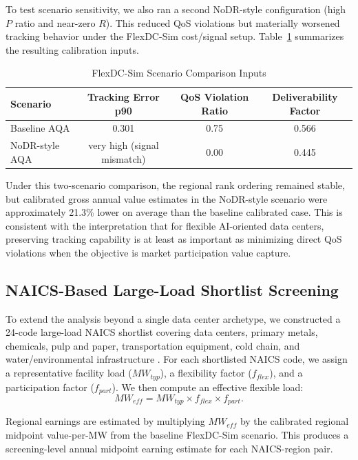 \documentclass[12pt]{article}
\begin{document}
To test scenario sensitivity, we also ran a second NoDR-style configuration (high $P$ ratio and near-zero $R$). This reduced QoS violations but materially worsened tracking behavior under the FlexDC-Sim cost/signal setup. Table~\ref{tab:flexdc_scenarios} summarizes the resulting calibration inputs.

\begin{table}[h]
\centering
\caption{FlexDC-Sim Scenario Comparison Inputs}\label{tab:flexdc_scenarios}
\begin{tabular}{lccc}
\toprule
\textbf{Scenario} & \textbf{Tracking Error p90} & \textbf{QoS Violation Ratio} & \textbf{Deliverability Factor} \\
\midrule
Baseline AQA & 0.301 & 0.75 & 0.566 \\
NoDR-style AQA & very high (signal mismatch) & 0.00 & 0.445 \\
\bottomrule
\end{tabular}
\end{table}

Under this two-scenario comparison, the regional rank ordering remained stable, but calibrated gross annual value estimates in the NoDR-style scenario were approximately 21.3\% lower on average than the baseline calibrated case. This is consistent with the interpretation that for flexible AI-oriented data centers, preserving tracking capability is at least as important as minimizing direct QoS violations when the objective is market participation value capture.

\subsection{NAICS-Based Large-Load Shortlist Screening}

To extend the analysis beyond a single data center archetype, we constructed a 24-code large-load NAICS shortlist covering data centers, primary metals, chemicals, pulp and paper, transportation equipment, cold chain, and water/environmental infrastructure \citep{naics_census}. For each shortlisted NAICS code, we assign a representative facility load ($MW_{typ}$), a flexibility factor ($f_{flex}$), and a participation factor ($f_{part}$). We then compute an effective flexible load:
\[
MW_{eff} = MW_{typ} \times f_{flex} \times f_{part}.
\]

Regional earnings are estimated by multiplying $MW_{eff}$ by the calibrated regional midpoint value-per-MW from the baseline FlexDC-Sim scenario. This produces a screening-level annual midpoint earning estimate for each NAICS-region pair.
\end{document}
